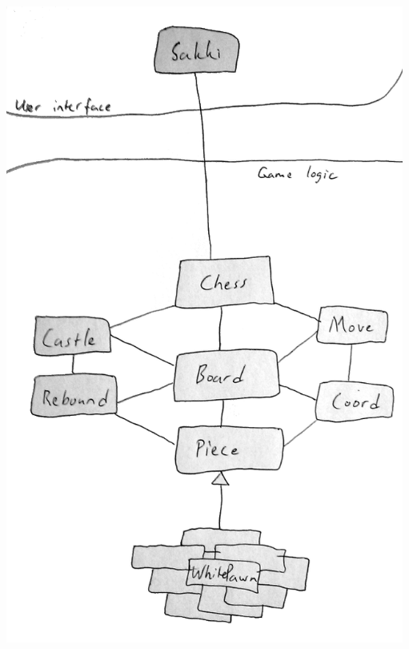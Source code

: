 \documentclass[12pt]{article}
\begin{document}
\newpage

\includegraphics[height=210mm]{luokkakaavio.png}
\end{document}

